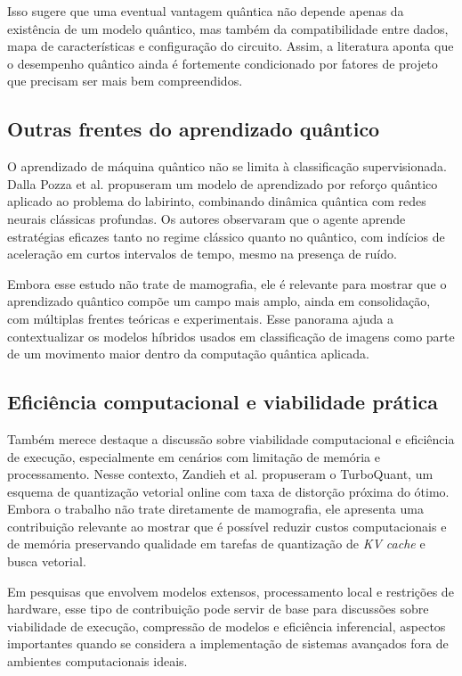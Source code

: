 Isso sugere que uma eventual vantagem quântica não depende apenas da existência de um modelo quântico, mas também da compatibilidade entre dados, mapa de características e configuração do circuito. Assim, a literatura aponta que o desempenho quântico ainda é fortemente condicionado por fatores de projeto que precisam ser mais bem compreendidos.

\subsection{Outras frentes do aprendizado quântico}

O aprendizado de máquina quântico não se limita à classificação supervisionada. Dalla Pozza et al. \cite{dallapozza2022} propuseram um modelo de aprendizado por reforço quântico aplicado ao problema do labirinto, combinando dinâmica quântica com redes neurais clássicas profundas. Os autores observaram que o agente aprende estratégias eficazes tanto no regime clássico quanto no quântico, com indícios de aceleração em curtos intervalos de tempo, mesmo na presença de ruído.

Embora esse estudo não trate de mamografia, ele é relevante para mostrar que o aprendizado quântico compõe um campo mais amplo, ainda em consolidação, com múltiplas frentes teóricas e experimentais. Esse panorama ajuda a contextualizar os modelos híbridos usados em classificação de imagens como parte de um movimento maior dentro da computação quântica aplicada.

\subsection{Eficiência computacional e viabilidade prática}

Também merece destaque a discussão sobre viabilidade computacional e eficiência de execução, especialmente em cenários com limitação de memória e processamento. Nesse contexto, Zandieh et al. \cite{zandieh2025} propuseram o TurboQuant, um esquema de quantização vetorial online com taxa de distorção próxima do ótimo. Embora o trabalho não trate diretamente de mamografia, ele apresenta uma contribuição relevante ao mostrar que é possível reduzir custos computacionais e de memória preservando qualidade em tarefas de quantização de \textit{KV cache} e busca vetorial.

Em pesquisas que envolvem modelos extensos, processamento local e restrições de hardware, esse tipo de contribuição pode servir de base para discussões sobre viabilidade de execução, compressão de modelos e eficiência inferencial, aspectos importantes quando se considera a implementação de sistemas avançados fora de ambientes computacionais ideais.

